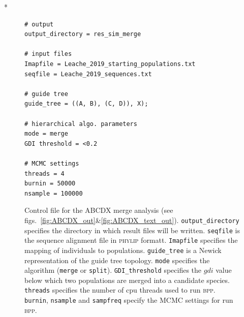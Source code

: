 \documentclass{article1}
\begin{document}

\renewcommand{\bibfont}{\scriptsize}



\newpage
\FloatBarrier %
\setcounter{table}{0} %
\setcounter{figure}{0} %
\renewcommand{\thetable}{S\arabic{table}} %
\renewcommand{\thefigure}{S\arabic{figure}} %

\newpage
*
\newpage

\begin{figure}[h]
	\footnotesize
    \begin{verbatim}
# output
output_directory = res_sim_merge

# input files
Imapfile = Leache_2019_starting_populations.txt
seqfile = Leache_2019_sequences.txt

# guide tree
guide_tree = ((A, B), (C, D)), X);

# hierarchical algo. parameters
mode = merge
GDI threshold = <0.2

# MCMC settings
threads = 4
burnin = 50000
nsample = 100000
\end{verbatim}

\caption{Control file for the ABCDX merge analysis (see
figs.~\ref{fig:ABCDX_out}\&\ref{fig:ABCDX_text_out}).  \texttt{output\_directory}
specifies the directory in which result files will be written.  \texttt{seqfile} is the
sequence alignment file in \textsc{phylip} formatt. \texttt{Imapfile} specifies the
mapping of individuals to populations. \texttt{guide\_tree} is a Newick representation of
the guide tree topology.  \texttt{mode} specifies the algorithm (\texttt{merge} or
\texttt{split}). \texttt{GDI\_threshold} specifies the $gdi$ value below which two
populations are merged into a candidate species.  \texttt{threads} specifies the number of
cpu threads used to run \textsc{bpp}.  \texttt{burnin}, \texttt{nsample} and
\texttt{sampfreq} specify the MCMC settings for run \textsc{bpp}. %
} \label{fig:ABCDX_mcf}
\end{figure}
\end{document}
